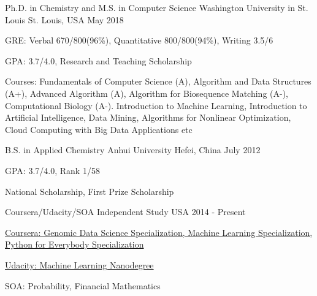 

\begin{cventries}

  \cventry
    {Ph.D. in Chemistry and M.S. in Computer Science} %
    {Washington University in St. Louis} %
    {St. Louis, USA} %
    {May 2018} %
    {
      \begin{cvitems} %
        \item {GRE: Verbal 670/800(96\%), Quantitative 800/800(94\%),  Writing 3.5/6 }
        \item {GPA: 3.7/4.0, Research and Teaching Scholarship}
        \item {Courses: Fundamentals of Computer Science (A), Algorithm and Data Structures (A+), Advanced Algorithm (A), Algorithm for Biosequence Matching (A-), Computational Biology (A-). Introduction to Machine Learning, Introduction to Artificial Intelligence, Data Mining, Algorithms for Nonlinear Optimization, Cloud Computing with Big Data Applications etc}
      \end{cvitems}
    }


  \cventry
    {B.S. in Applied Chemistry}  %
    {Anhui University} %
    {Hefei, China} %
    {July 2012} %
    {
      \begin{cvitems} %
        \item {GPA: 3.7/4.0, Rank 1/58 }
        \item {National Scholarship, First Prize Scholarship}
      \end{cvitems}
    }

 \cventry
    {Coursera/Udacity/SOA}  %
    {Independent Study} %
    {USA} %
    {2014 - Present} %
    {
      \begin{cvitems} %
        \item {\href{https://github.com/lvchen727/coursera}{Coursera: Genomic Data Science Specialization, Machine Learning Specialization, Python for Everybody Specialization}}
        \item {\href{https://github.com/lvchen727/udacity-machine-learning}{Udacity: Machine Learning Nanodegree}}
		\item {SOA: Probability, Financial Mathematics}
      \end{cvitems}
    }

\end{cventries}
